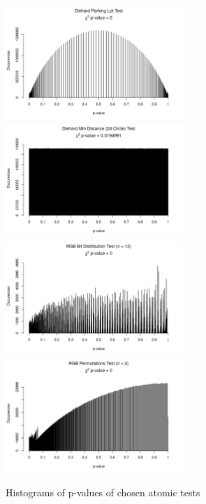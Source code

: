 \documentclass[
  digital,  	%
  color,		%
  oneside,   	%
  12pt,
  nocover,
  notable,
  nolof,
  nolot,
]{fithesis3}
\theoremstyle{definition}
\theoremstyle{remark}
\begin{document}
\begin{figure}[h]
\begin{nomar}
\centering
\includegraphics[width=0.6\textwidth]{figures/010.png} 
\includegraphics[width=0.6\textwidth]{figures/011.png}
\\
\includegraphics[width=0.6\textwidth]{figures/200_-n_12.png} 
\includegraphics[width=0.6\textwidth]{figures/202_-n_2.png}
\end{nomar}
\caption{Histograms of p-values of chosen atomic tests}
\label{fig:non_uniform_pval_hist}
\end{figure}
\end{document}
